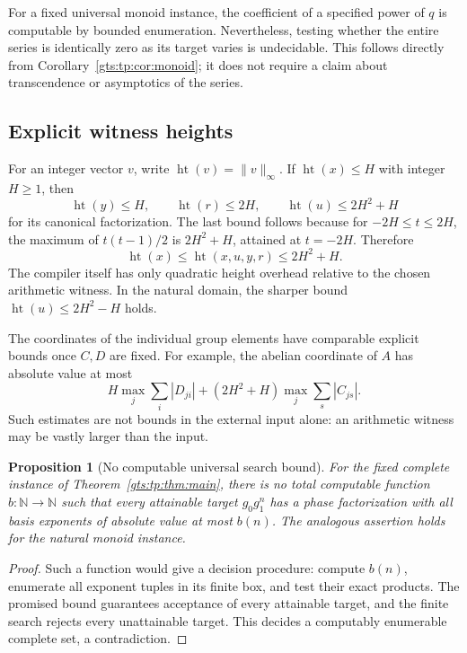 \documentclass[11pt,letterpaper]{article}
\newtheorem{proposition}[theorem]{Proposition}
\theoremstyle{definition}
\theoremstyle{remark}
\newcommand{\NN}{\mathbb N}
\newcommand{\htn}{\operatorname{ht}}
\begin{document}
For a fixed universal monoid instance, the coefficient of a specified
power of $q$ is computable by bounded enumeration. Nevertheless, testing
whether the entire series is identically zero as its target varies is
undecidable. This follows directly from Corollary~\ref{gts:tp:cor:monoid}; it does
not require a claim about transcendence or asymptotics of the series.

\subsection{Explicit witness heights}
For an integer vector $v$, write $\htn(v)=\|v\|_\infty$. If $\htn(x)\leq H$
with integer $H\geq1$, then
\[
 \htn(y)\leq H,\qquad \htn(r)\leq2H,\qquad
 \htn(u)\leq2H^2+H
\]
for its canonical factorization. The last bound follows because for
$-2H\leq t\leq2H$, the maximum of $t(t-1)/2$ is $2H^2+H$, attained at
$t=-2H$. Therefore
\begin{equation}\label{gts:tp:eq:height}
 \htn(x)\leq\htn(x,u,y,r)\leq2H^2+H.
\end{equation}
The compiler itself has only quadratic height overhead relative to the
chosen arithmetic witness. In the natural domain, the sharper bound
$\htn(u)\leq2H^2-H$ holds.

The coordinates of the individual group elements have comparable explicit
bounds once $C,D$ are fixed. For example, the abelian coordinate of $A$ has
absolute value at most
\[
    H\max_j\sum_i|D_{ji}|+(2H^2+H)\max_j\sum_s|C_{js}|.
\]
Such estimates are not bounds in the external input alone: an arithmetic
witness may be vastly larger than the input.

\begin{proposition}[No computable universal search bound]\label{gts:tp:prop:nobound}
For the fixed complete instance of Theorem~\ref{gts:tp:thm:main}, there is no total
computable function $b:\NN\to\NN$ such that every attainable target
$g_0g_1^n$ has a phase factorization with all basis exponents of absolute
value at most $b(n)$. The analogous assertion holds for the natural monoid
instance.
\end{proposition}
\begin{proof}
Such a function would give a decision procedure: compute $b(n)$, enumerate
all exponent tuples in its finite box, and test their exact products. The
promised bound guarantees acceptance of every attainable target, and the
finite search rejects every unattainable target. This decides a
computably enumerable complete set, a contradiction.
\end{proof}
\end{document}
